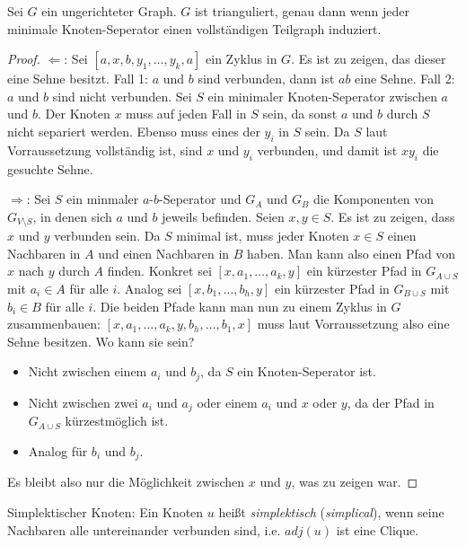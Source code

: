 \documentclass[../main.tex]{subfiles}
\begin{document}
\begin{satz}\label{thm:triangulated--completeSeperator}
    Sei $G$ ein ungerichteter Graph. $G$ ist trianguliert, genau dann wenn jeder minimale Knoten-Seperator einen vollständigen Teilgraph induziert.
\end{satz}
\begin{proof}
    $\Leftarrow$: Sei $[a, x, b, y_1, \hdots, y_k, a]$ ein Zyklus in $G$. Es ist zu zeigen, das dieser eine Sehne besitzt. Fall 1: $a$ und $b$ sind verbunden, dann ist $ab$ eine Sehne. Fall 2: $a$ und $b$ sind nicht verbunden. Sei $S$ ein minimaler Knoten-Seperator zwischen $a$ und $b$. Der Knoten $x$ muss auf jeden Fall in $S$ sein, da sonst $a$ und $b$ durch $S$ nicht separiert werden. Ebenso muss eines der $y_i$ in $S$ sein. Da $S$ laut Vorraussetzung vollständig ist, sind $x$ und $y_i$ verbunden, und damit ist $xy_i$ die gesuchte Sehne.

    $\Rightarrow$: Sei $S$ ein minmaler $a$-$b$-Seperator und $G_A$ und $G_B$ die Komponenten von $G_{V \setminus S}$, in denen sich $a$ und $b$ jeweils befinden. Seien $x, y \in S$. Es ist zu zeigen, dass $x$ und $y$ verbunden sein. Da $S$ minimal ist, muss jeder Knoten $x \in S$ einen Nachbaren in $A$ und einen Nachbaren in $B$ haben. Man kann also einen Pfad von $x$ nach $y$ durch $A$ finden. Konkret sei $[x, a_1, \hdots, a_k, y]$ ein kürzester Pfad in $G_{A \cup S}$ mit $a_i \in A$ für alle $i$. Analog sei $[x, b_1, \hdots, b_h, y]$ ein kürzester Pfad in $G_{B \cup S}$ mit $b_i \in B$ für alle $i$. Die beiden Pfade kann man nun zu einem Zyklus in $G$ zusammenbauen: $[x, a_1, \hdots, a_k, y, b_h, \hdots, b_1, x]$ muss laut Vorraussetzung also eine Sehne besitzen. Wo kann sie sein?
    
    \begin{itemize}
        \item Nicht zwischen einem $a_i$ und $b_j$, da $S$ ein Knoten-Seperator ist.
        \item Nicht zwischen zwei $a_i$ und $a_j$ oder einem $a_i$ und $x$ oder $y$, da der Pfad in $G_{A \cup S}$ kürzestmöglich ist.
        \item Analog für $b_i$ und $b_j$.
    \end{itemize}
    Es bleibt also nur die Möglichkeit zwischen $x$ und $y$, was zu zeigen war.
\end{proof}
        
\begin{definition}
    Simplektischer Knoten: Ein Knoten $u$ heißt \emph{simplektisch} (\emph{simplical}), wenn seine Nachbaren alle untereinander verbunden sind, i.e. $adj(u)$ ist eine Clique.
\end{definition}
\end{document}
